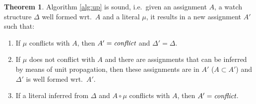 \documentclass{vutinfth} %
\theoremstyle{example}
\theoremstyle{definition}
\theoremstyle{theorem}
\newtheorem{theorem}{Theorem}[section]
\theoremstyle{lemma}
\theoremstyle{corollary}
\newcommand{\ass}{A}
\newcommand{\welf}{well formed\xspace}
\newcommand{\sgl}{\mu}
\begin{document}
\begin{theorem}
Algorithm \ref{alg:up} is sound, i.e.~given an assignment $\ass$, a watch structure $\Delta$ \welf wrt.~$\ass$ and a literal $\sgl$, it results in a new assignment $\ass'$ such that:
\begin{enumerate}
\item If $\sgl$ conflicts with $\ass$, then $\ass' = \emph{conflict}$ and $\Delta' = \Delta$. %

\item If $\sgl$ does not conflict with $\ass$ and there are assignments that can be inferred by means of unit propagation, then these assignments are in $\ass'$ ($\ass \subset \ass'$) and $\Delta'$ is \welf wrt.~$\ass'$.

\item If a literal inferred from $\Delta$ and $\ass \circ \sgl$ conflicts with $\ass$, then $\ass' = \emph{conflict}$.
\end{enumerate}
\end{theorem}
\end{document}
